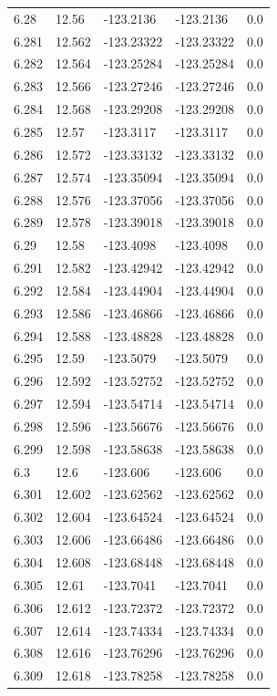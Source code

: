 \begin{tabular}{lllll}
6.28 & 12.56 & -123.2136 & -123.2136 & 0.0 \\
6.281 & 12.562 & -123.23322 & -123.23322 & 0.0 \\
6.282 & 12.564 & -123.25284 & -123.25284 & 0.0 \\
6.283 & 12.566 & -123.27246 & -123.27246 & 0.0 \\
6.284 & 12.568 & -123.29208 & -123.29208 & 0.0 \\
6.285 & 12.57 & -123.3117 & -123.3117 & 0.0 \\
6.286 & 12.572 & -123.33132 & -123.33132 & 0.0 \\
6.287 & 12.574 & -123.35094 & -123.35094 & 0.0 \\
6.288 & 12.576 & -123.37056 & -123.37056 & 0.0 \\
6.289 & 12.578 & -123.39018 & -123.39018 & 0.0 \\
6.29 & 12.58 & -123.4098 & -123.4098 & 0.0 \\
6.291 & 12.582 & -123.42942 & -123.42942 & 0.0 \\
6.292 & 12.584 & -123.44904 & -123.44904 & 0.0 \\
6.293 & 12.586 & -123.46866 & -123.46866 & 0.0 \\
6.294 & 12.588 & -123.48828 & -123.48828 & 0.0 \\
6.295 & 12.59 & -123.5079 & -123.5079 & 0.0 \\
6.296 & 12.592 & -123.52752 & -123.52752 & 0.0 \\
6.297 & 12.594 & -123.54714 & -123.54714 & 0.0 \\
6.298 & 12.596 & -123.56676 & -123.56676 & 0.0 \\
6.299 & 12.598 & -123.58638 & -123.58638 & 0.0 \\
6.3 & 12.6 & -123.606 & -123.606 & 0.0 \\
6.301 & 12.602 & -123.62562 & -123.62562 & 0.0 \\
6.302 & 12.604 & -123.64524 & -123.64524 & 0.0 \\
6.303 & 12.606 & -123.66486 & -123.66486 & 0.0 \\
6.304 & 12.608 & -123.68448 & -123.68448 & 0.0 \\
6.305 & 12.61 & -123.7041 & -123.7041 & 0.0 \\
6.306 & 12.612 & -123.72372 & -123.72372 & 0.0 \\
6.307 & 12.614 & -123.74334 & -123.74334 & 0.0 \\
6.308 & 12.616 & -123.76296 & -123.76296 & 0.0 \\
6.309 & 12.618 & -123.78258 & -123.78258 & 0.0 \\

\end{tabular}
